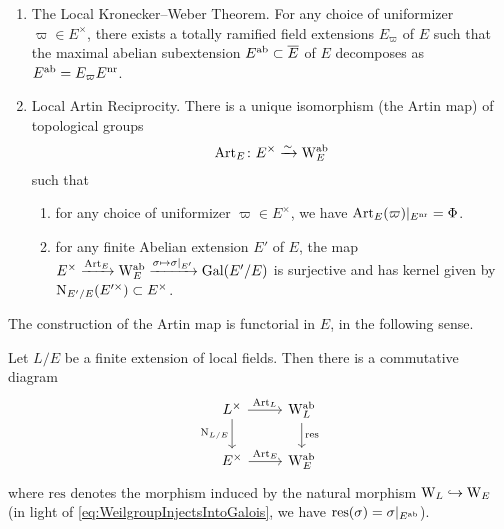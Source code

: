 \documentclass[../main.tex]{subfiles}
\begin{document}
\begin{thm}\label{thm:LocalKroneckerWeber} \leavevmode
  \vspace{-0.5em}
  \begin{enumerate}
    \item \textnormal{The Local Kronecker--Weber Theorem.} For any choice of uniformizer $\varpi \in E^\times$, there exists a 
      totally ramified field extensions $E_\varpi$ of $E$ such that 
      the maximal abelian subextension $E^{\mathrm{ab}} \subset \overline E$ of $E$
      decomposes as $E^{\mathrm{ab}} = E_\varpi E^{\mathrm{nr}}$.     
    \item \textnormal{Local Artin Reciprocity.} There is a unique isomorphism
      (the Artin map) of topological groups
      \begin{equation*}
        \operatorname{Art}_E\colon E^\times \xrightarrow{\sim} \mathrm W_E^{\mathrm{ab}}
      \end{equation*}
      such that 
      \begin{enumerate}
        \item for any choice of uniformizer $\varpi \in E^\times$, we have
          $\operatorname{Art}_E(\varpi)|_{E^{\mathrm{nr}}} = \Phi$.
        \item for any finite Abelian extension $E'$ of $E$, the
          map $E^\times \xrightarrow{\operatorname{Art}_E} \mathrm W_E^{\mathrm{ab}} \xrightarrow{\sigma \mapsto
          \sigma|_{E'}} \operatorname{Gal}(E'/E)$ is surjective and has kernel given by
          $\operatorname{N}_{E'/E}(E'^\times) \subset E^\times$. 
      \end{enumerate}
  \end{enumerate}
\end{thm}

The construction of the Artin map is functorial in $E$, in the following sense.

\begin{thm}\label{thm:ArtinMapFunc}
  Let $L/E$ be a finite extension of local fields. Then there is a
  commutative diagram
  \begin{equation*}
  \begin{tikzcd}[ampersand replacement=\&]
  	{L^\times} \& {\Weil_L^\ab} \\
  	{E^\times} \& {\Weil_E^\ab}
  	\arrow["{\Art_L}", from=1-1, to=1-2]
  	\arrow["{\Norm_{L/E}}"', from=1-1, to=2-1]
    \arrow["{\mathrm{res}}", from=1-2, to=2-2]
  	\arrow["{\Art_E}", from=2-1, to=2-2]
  \end{tikzcd}
  \end{equation*}
  where $\mathrm{res}$ denotes the morphism induced by the natural 
  morphism $\mathrm W_L \hookrightarrow \mathrm W_E$ (in light of \eqref{eq:WeilgroupInjectsIntoGalois}, 
  we have $\operatorname{res}(\sigma) = \sigma|_{E^{\mathrm{ab}}}$).
\end{thm}
\end{document}
